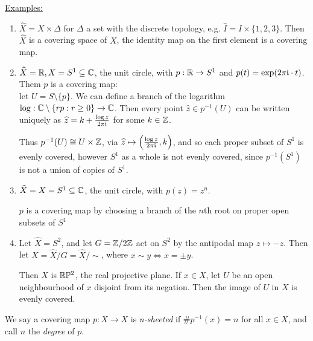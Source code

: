 \documentclass[10pt,a4paper]{article}
\begin{document}
\begin{center}
\end{center}
\underline{Examples:}
\begin{enumerate}
\setcounter{enumi}{0}
\item $\hat{X} = X\times \Delta$ for $\Delta$ a set with the discrete topology, e.g. $\hat{I} = I\times\{1,2,3\}$. Then $\hat{X}$ is a covering space of $X$, the identity map on the first element is a covering map.

\item $\widehat{X} = \mathbb{R}, X = S^1 \subseteq \mathbb{C}$, the unit circle, with $p:\mathbb{R}\rightarrow S^1$ and $p(t) = \exp(2\pi\mathfrak{i}\cdot t)$. Them $p$ is a covering map:\\
let $U = S\setminus \{p\}$. We can define a branch of the logarithm $\log:\mathbb{C}\setminus \{rp : r \geq 0\} \rightarrow \mathbb{C}$. Then every point $\hat{z}\in p^{-1}(U)$ can be written uniquely as $\widehat{z} = k + \frac{\log z}{2\pi\mathfrak{i}}$ for some $k\in\mathbb{Z}$.

Thus $p^{-1}(U) \cong U\times \mathbb{Z}$, via $\widehat{z} \mapsto \left(\frac{\log z}{2\pi\mathfrak{i}}, k\right)$, and so each proper subset of $S^{1}$ is evenly covered, however $S^1$ as a whole is not evenly covered, since $p^{-1}(S^1)$ is not a union of copies of $S^1$.

\item $\widehat{X}=X = S^1 \subseteq \mathbb{C}$, the unit circle, with $p(z) = z^n$.

$p$ is a covering map by choosing a branch of the $n$th root on proper open subsets of $S^1$

\item Let $\hat{X} = S^2$, and let  $G = \mathbb{Z}/2\mathbb{Z}$  act on $S^2$ by the antipodal map $z \mapsto -z$. Then let $X = \hat{X}/G = \hat{X}/\sim$, where $x\sim y \iff x = \pm y$.

Then $X$ is $\mathbb{R}\mathbb{P}^2$, the real projective plane. If $x\in X$, let $U$ be an open neighbourhood of $x$ disjoint from its negation. Then the image of $U$ in $X$ is evenly covered.
\end{enumerate}

We say a covering map $p:\hat{X} \rightarrow X$ is \emph{n-sheeted} if $\#p^{-1}(x) = n$ for all $x\in X$, and call $n$ the \emph{degree} of $p$.
\end{document}
